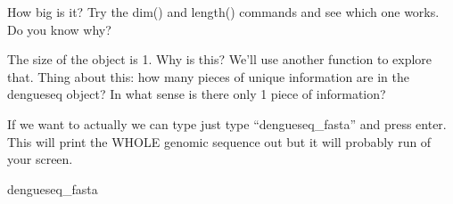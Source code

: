 \documentclass[
]{book}
\newenvironment{Shaded}{\begin{snugshade}}{\end{snugshade}}
\newcommand{\NormalTok}[1]{#1}
\begin{document}
How big is it? Try the dim() and length() commands and see which one works. Do you know why?

The size of the object is 1. Why is this? We'll use another function to explore that. Thing about this: how many pieces of unique information are in the dengueseq object? In what sense is there only 1 piece of information?

If we want to actually we can type just type ``dengueseq\_fasta'' and press enter. This will print the WHOLE genomic sequence out but it will probably run of your screen.

\begin{Shaded}
\begin{Highlighting}[]
\NormalTok{dengueseq\_fasta}
\end{Highlighting}
\end{Shaded}
\end{document}
